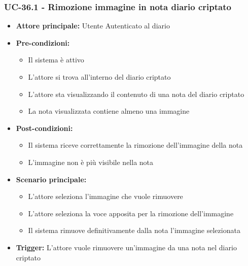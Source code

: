 \documentclass[a4paper,12pt]{article}
\begin{document}
\subsubsection{UC-36.1 - Rimozione immagine in nota diario criptato} \label{subsec:UC-36.1}
\begin{itemize}
    \item \textbf{Attore principale:} Utente Autenticato al diario
    \item \textbf{Pre-condizioni:}
    \begin{itemize}
        \item Il sistema è attivo
        \item L'attore si trova all'interno del diario criptato
        \item L'attore sta visualizzando il contenuto di una nota del diario criptato
        \item La nota visualizzata contiene almeno una immagine
    \end{itemize}
    \item \textbf{Post-condizioni:}
    \begin{itemize}
        \item Il sistema riceve correttamente la rimozione dell'immagine della nota
        \item L'immagine non è più visibile nella nota
    \end{itemize}
    \item \textbf{Scenario principale:}
    \begin{itemize}
        \item L'attore seleziona l'immagine che vuole rimuovere
        \item L'attore seleziona la voce apposita per la rimozione dell'immagine
        \item Il sistema rimuove definitivamente dalla nota l'immagine selezionata
    \end{itemize}
    \item \textbf{Trigger:} L'attore vuole rimuovere un'immagine da una nota nel diario criptato
\end{itemize}
\end{document}
